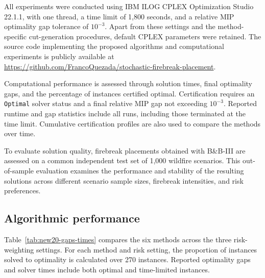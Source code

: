 \documentclass{itor}
\begin{document}
All experiments were conducted using IBM ILOG CPLEX Optimization
Studio 22.1.1, with one thread, a time limit of 1,800 seconds, and
a relative MIP optimality gap tolerance of $10^{-3}$. Apart from these settings and the method-specific cut-generation procedures, default CPLEX parameters were retained. The source code implementing the proposed algorithms and computational experiments is publicly available at \url{https://github.com/FrancoQuezada/stochastic-firebreak-placement}.

Computational performance is assessed through solution times,
final optimality gaps, and the percentage of instances certified
optimal. Certification requires an \texttt{Optimal} solver status
and a final relative MIP gap not exceeding $10^{-3}$.
Reported runtime and gap statistics include all runs, including
those terminated at the time limit. Cumulative certification profiles are also used to compare the methods over time.

To evaluate solution quality, firebreak placements obtained with
B\&B-III are assessed on a common independent test set of 1,000
wildfire scenarios. This out-of-sample evaluation examines the
performance and stability of the resulting solutions across
different scenario sample sizes, firebreak intensities, and
risk preferences.


\subsection{Algorithmic performance}\label{sec:results}

Table~\ref{tab:new20-gaps-times} compares the six methods across the three risk-weighting settings. For each method and risk setting, the proportion of instances solved to optimality is calculated over 270 instances. Reported optimality gaps and solver times include both optimal and time-limited instances. 
\end{document}
